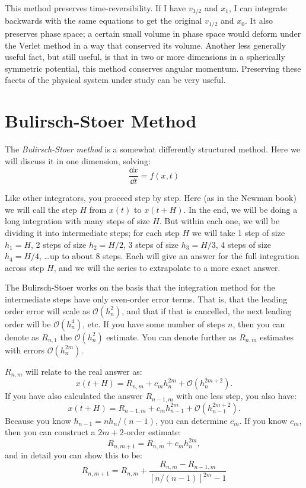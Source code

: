 This method preserves time-reversibility. If I have $v_{3/2}$ and
$x_1$, I can integrate backwards with the same equations to get the
original $v_{1/2}$ and $x_0$. It also preserves phase space; a certain
small volume in phase space would deform under the Verlet method in a
way that conserved its volume. Another less generally useful fact, but
still useful, is that in two or more dimensions in a spherically
symmetric potential, this method conserves angular
momentum. Preserving these facets of the physical system under study
can be very useful.

\section{Bulirsch-Stoer Method}

The {\it Bulirsch-Stoer method} is a somewhat differently structured
method. Here we will discuss it in one dimension, solving:
\begin{equation}
\frac{\dd{x}}{\dd{t}} = f(x,t)
\end{equation}

Like other integrators, you proceed step by step. Here (as in the
Newman book) we will call the step $H$ from $x(t)$ to $x(t+H)$. In the
end, we will be doing a long integration with many steps of size
$H$. But within each one, we will be dividing it into intermediate
steps; for each step $H$ we will take 1 step of size $h_1 =H$, 2 steps
of size $h_2 = H / 2$, 3 steps of size $h_3 = H/3$, 4 steps of size
$h_4 = H / 4$, \ldots up to about 8 steps.  Each will give an answer
for the full integration across step $H$, and we will the series to
extrapolate to a more exact answer.

The Bulirsch-Stoer works on the basis that the integration method for
the intermediate steps have only even-order error terms. That is, that
the leading order error will scale as $\mathcal{O}(h_n^{2})$, and that
if that is cancelled, the next leading order will be
$\mathcal{O}(h_n^4)$, etc. If you have some number of steps $n$, then
you can denote as $R_{n,1}$ the $\mathcal{O}(h_n^{2})$ estimate.  You
can denote further as $R_{n,m}$ estimates with errors
$\mathcal{O}(h_n^{2m})$. 

$R_{n,m}$ will relate to the real answer as:
\begin{equation}
x(t+H) = R_{n,m} + c_m h_n^{2m} + \mathcal{O}(h_n^{2m+2}).
\end{equation}
If you have also calculated the answer $R_{n-1,m}$ with one less step,
you also have:
\begin{equation}
x(t+H) = R_{n-1,m} + c_m h_{n-1}^{2m} + \mathcal{O}(h_{n-1}^{2m+2}).
\end{equation}
Because you know $h_{n-1} = n h_n / (n-1)$, you can determine $c_m$.
If you know $c_m$, then you can construct a $2m+2$-order estimate:
\begin{equation}
  R_{n,m+1} = R_{n,m} +c_mh_n^{2m},
\end{equation}
and in detail you can show this to be:
\begin{equation}
  R_{n,m+1} = R_{n,m} + \frac{R_{n,m} - R_{n-1,
      m}}{\left[n/(n-1)\right]^{2m} -1}
\end{equation}

